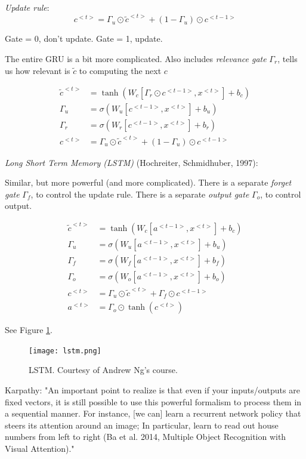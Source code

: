\documentclass[english]{article}
\begin{document}
\emph{Update rule}: 
$$c^{<t>} = \Gamma_u \odot \tilde c^{<t>} + (1-\Gamma_u) \odot c^{<t-1>}$$

Gate = 0, don't update. Gate = 1, update.

The entire GRU is a bit more complicated. Also includes \emph{relevance gate} $\Gamma_r$, tells us how relevant is $\tilde c$ to computing the next $c$ 

\begin{align*}
\tilde c^{<t>} &= \tanh(W_c [\Gamma_r  \odot c^{<t-1>},x^{<t>}]+b_c)\\
\Gamma_u &= \sigma(W_u [c^{<t-1>},x^{<t>}]+b_u)\\
\Gamma_r &= \sigma(W_r [c^{<t-1>},x^{<t>}]+b_r)\\
c^{<t>} & = \Gamma_u \odot \tilde c^{<t>} + (1-\Gamma_u) \odot c^{<t-1>}
\end{align*}


\item \emph{Long Short Term Memory (LSTM)} (Hochreiter, Schmidhuber, 1997): 

Similar, but more powerful (and more complicated). There is a separate \emph{forget gate} $\Gamma_f$, to control the update rule. There is a separate \emph{output gate}  $\Gamma_o$, to control output. 

\begin{align*}
\tilde c^{<t>} &= \tanh(W_c [a^{<t-1>},x^{<t>}]+b_c)\\
\Gamma_u &= \sigma(W_u [a^{<t-1>},x^{<t>}]+b_u)\\
\Gamma_f &= \sigma(W_f [a^{<t-1>},x^{<t>}]+b_f)\\
\Gamma_o &= \sigma(W_o [a^{<t-1>},x^{<t>}]+b_o)\\
c^{<t>} & = \Gamma_u \odot \tilde c^{<t>} + \Gamma_f \odot c^{<t-1>}\\
a^{<t>} & = \Gamma_o \odot \tanh(c^{<t>})
\end{align*}

See Figure \ref{lstm}. 

\begin{figure}
  \centering
  \texttt{[image: lstm.png]}
    \caption{LSTM. Courtesy of Andrew Ng's course.}
    \label{lstm}
\end{figure}


\item  Karpathy: "An important point to realize is that even if your inputs/outputs are fixed vectors, it is still possible to use this powerful formalism to process them in a sequential manner. For instance, [we can] learn a recurrent network policy that steers its attention around an image; In particular, learn to read out house numbers from left to right (Ba et al. 2014, Multiple Object Recognition with Visual Attention)."
\end{document}
